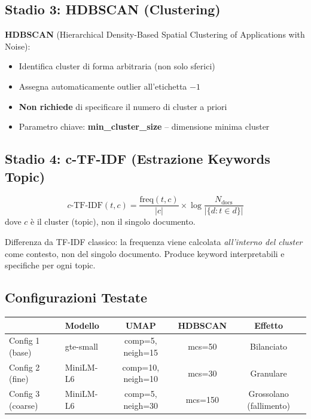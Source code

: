 \documentclass[12pt,a4paper]{article}
\begin{document}
\subsection{Stadio 3: HDBSCAN (Clustering)}

\begin{defbox}
\textbf{HDBSCAN} (Hierarchical Density-Based Spatial Clustering of Applications with Noise):
\begin{itemize}
  \item Identifica cluster di forma arbitraria (non solo sferici)
  \item Assegna automaticamente outlier all'etichetta $-1$
  \item \textbf{Non richiede} di specificare il numero di cluster a priori
  \item Parametro chiave: \textbf{min\_cluster\_size} -- dimensione minima cluster
\end{itemize}
\end{defbox}

\subsection{Stadio 4: c-TF-IDF (Estrazione Keywords Topic)}

\begin{formulabox}
\[
c\text{-TF-IDF}(t, c) = \frac{\text{freq}(t, c)}{|c|} \times \log\frac{N_{\text{docs}}}{|\{d : t \in d\}|}
\]
dove $c$ \`e il cluster (topic), non il singolo documento.
\end{formulabox}

Differenza da TF-IDF classico: la frequenza viene calcolata \emph{all'interno del cluster} come contesto, non del singolo documento. Produce keyword interpretabili e specifiche per ogni topic.

\subsection{Configurazioni Testate}

\begin{center}
\begin{tabular}{llccc}
\toprule
 & \textbf{Modello} & \textbf{UMAP} & \textbf{HDBSCAN} & \textbf{Effetto} \\
\midrule
Config 1 (base)   & gte-small   & comp=5, neigh=15  & mcs=50  & Bilanciato \\
Config 2 (fine)   & MiniLM-L6   & comp=10, neigh=10 & mcs=30  & Granulare \\
Config 3 (coarse) & MiniLM-L6   & comp=5, neigh=30  & mcs=150 & Grossolano (fallimento) \\
\bottomrule
\end{tabular}
\end{center}
\end{document}

